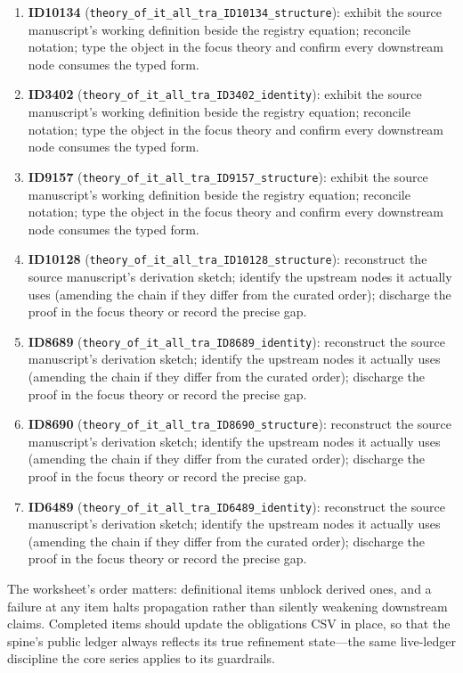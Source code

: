 \documentclass[11pt]{article}
\theoremstyle{remark}
\begin{document}
\begin{enumerate}
\item \textbf{ID10134} (\texttt{theory\_of\_it\_all\_tra\_ID10134\_structure}): exhibit the source manuscript's working definition beside the registry equation; reconcile notation; type the object in the focus theory and confirm every downstream node consumes the typed form.
\item \textbf{ID3402} (\texttt{theory\_of\_it\_all\_tra\_ID3402\_identity}): exhibit the source manuscript's working definition beside the registry equation; reconcile notation; type the object in the focus theory and confirm every downstream node consumes the typed form.
\item \textbf{ID9157} (\texttt{theory\_of\_it\_all\_tra\_ID9157\_structure}): exhibit the source manuscript's working definition beside the registry equation; reconcile notation; type the object in the focus theory and confirm every downstream node consumes the typed form.
\item \textbf{ID10128} (\texttt{theory\_of\_it\_all\_tra\_ID10128\_structure}): reconstruct the source manuscript's derivation sketch; identify the upstream nodes it actually uses (amending the chain if they differ from the curated order); discharge the proof in the focus theory or record the precise gap.
\item \textbf{ID8689} (\texttt{theory\_of\_it\_all\_tra\_ID8689\_identity}): reconstruct the source manuscript's derivation sketch; identify the upstream nodes it actually uses (amending the chain if they differ from the curated order); discharge the proof in the focus theory or record the precise gap.
\item \textbf{ID8690} (\texttt{theory\_of\_it\_all\_tra\_ID8690\_structure}): reconstruct the source manuscript's derivation sketch; identify the upstream nodes it actually uses (amending the chain if they differ from the curated order); discharge the proof in the focus theory or record the precise gap.
\item \textbf{ID6489} (\texttt{theory\_of\_it\_all\_tra\_ID6489\_identity}): reconstruct the source manuscript's derivation sketch; identify the upstream nodes it actually uses (amending the chain if they differ from the curated order); discharge the proof in the focus theory or record the precise gap.
\end{enumerate}

The worksheet's order matters: definitional items unblock derived ones, and a failure at any item halts propagation rather than silently weakening downstream claims. Completed items should update the obligations CSV in place, so that the spine's public ledger always reflects its true refinement state---the same live-ledger discipline the core series applies to its guardrails.
\end{document}
